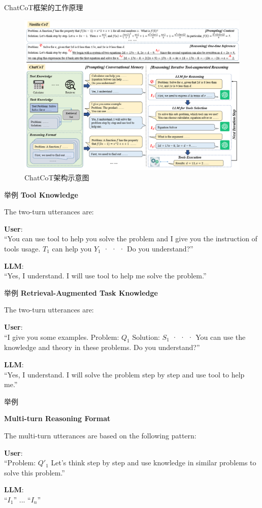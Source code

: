 \begin{frame}{ChatCoT框架的工作原理}
    \begin{figure}
        \centering
        \includegraphics[width=.6\linewidth]{./pic/vanilla_CoT_and_ChatCoT.png}
        \caption{ChatCoT架构示意图}
        \label{fig:chatcot}
    \end{figure}
\end{frame}

\begin{frame}{举例}
    \textbf{Tool Knowledge}
    
    The two-turn utterances are:
    
    \textbf{User}: \\
    “You can use tool to help you solve the problem and I give you the instruction of tools usage. 
    \( T_1 \) can help you \( Y_1 \) · · · Do you understand?”
    
    \textbf{LLM}: \\
    “Yes, I understand. I will use tool to help me solve the problem.”
    
\end{frame}
\begin{frame}{举例}   
    \textbf{Retrieval-Augmented Task Knowledge}
    
    The two-turn utterances are:
    
    \textbf{User}: \\
    “I give you some examples. 
    Problem: \( Q_1 \)  
    Solution: \( S_1 \)  
    · · · 
    You can use the knowledge and theory in these problems. Do you understand?”
    
    \textbf{LLM}: \\
    “Yes, I understand. I will solve the problem step by step and use tool to help me.”
    
\end{frame}
\begin{frame}{举例}
    
    \textbf{Multi-turn Reasoning Format}
    
    The multi-turn utterances are based on the following pattern:
    
    \textbf{User}: \\
    “Problem: \( Q'_1 \)  
    Let’s think step by step and use knowledge in similar problems to solve this problem.”
    
    \textbf{LLM}: \\
    “\( I_1 \)”  
    ... 
    “\( I_n \)”
\end{frame}

